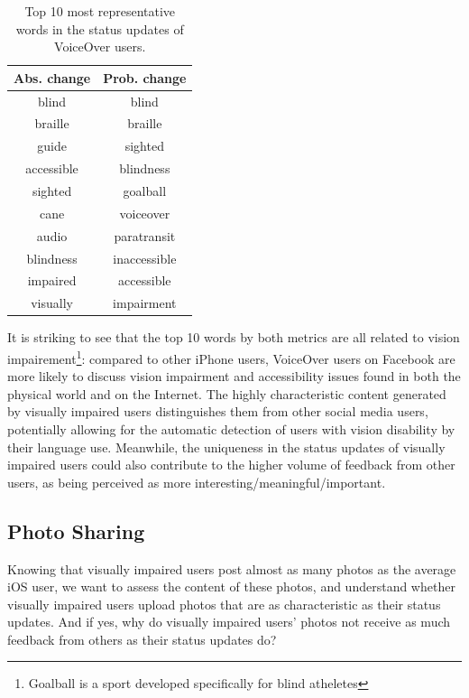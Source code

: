 \documentclass{sigchi}
\newcommand\tabhead[1]{\small\textbf{#1}}
\begin{document}
\begin{table}
  \centering
  \begin{tabular}{c|c}
    \hline
      \tabhead{Abs. change} & \tabhead{Prob. change} \\
    \hline
  blind & blind \\
  braille & braille \\
  guide & sighted \\
  accessible & blindness \\
  sighted & goalball \\
  cane & voiceover \\
  audio & paratransit \\
  blindness & inaccessible \\
  impaired & accessible \\
  visually & impairment \\
  \hline
  \end{tabular}
  \caption{Top 10 most representative words in the status updates of VoiceOver users. }
  \label{tab:status_top_words}
\end{table}

It is striking to see that the top 10 words by both metrics are all related to vision impairement\footnote{Goalball is a sport developed specifically for blind atheletes}: compared to other iPhone users, VoiceOver users on Facebook are more likely to discuss vision impairment and accessibility issues found in both the physical world and on the Internet. The highly characteristic content generated by visually impaired users distinguishes them from other social media users, potentially allowing for the automatic detection of users with vision disability by their language use. Meanwhile, the uniqueness in the status updates of visually impaired users could also contribute to the higher volume of feedback from other users, as being perceived as more interesting/meaningful/important.



\subsection{Photo Sharing}
Knowing that visually impaired users post almost as many photos as the average iOS user, we want to assess the content of these photos, and understand whether visually impaired users upload photos that are as characteristic as their status updates. And if yes, why do visually impaired users' photos not receive as much feedback from others as their status updates do?
\end{document}
